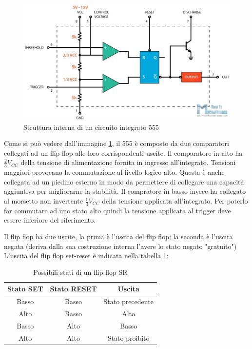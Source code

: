 \begin{figure}[h!]
	\centering
	\includegraphics[width=\linewidth]{./ImageFiles/Laboratorio 4/555internals.jpg}
	\caption{Struttura interna di un circuito integrato 555}
	\label{fig:555_internals}
\end{figure}

\noindent
Come si può vedere dall'immagine \ref{fig:555_internals}, il 555 è composto da due comparatori collegati ad un flip flop alle loro corrispondenti uscite. Il comparatore in alto ha $\frac{2}{3}V_{CC}$ della tensione di alimentazione fornita in ingresso all'integrato. Tensioni maggiori provocano la commutazione al livello logico alto. Questa è anche collegata ad un piedino esterno in modo da permettere di collegare una capacità aggiuntiva per migliorarne la stabilità. Il compratore in basso invece ha collegato al morsetto non invertente $\frac{1}{3}V_{CC}$ della tensione applicata all'integrato. Per poterlo far commutare ad uno stato alto quindi la tensione applicata al trigger deve essere inferiore del riferimento.

Il flip flop ha due uscite, la prima è l'uscita del flip flop; la seconda è l'uscita negata (deriva dalla sua costruzione interna l'avere lo stato negato "gratuito")
L'uscita del flip flop set-reset è indicata nella tabella \ref{tab:flip_flop_states}:

\def\arraystretch{1.3}
\begin{table}[h!]
	\centering
	\begin{tabular}{|c|c|c|}
		\hline
		Stato SET	& Stato RESET & Uscita \\ \hline
		Basso & Basso & Stato precedente  \\ \hline
		Alto & Basso & Alto\\ \hline
		Basso & Alto & Basso\\ \hline
		Alto & Alto & Stato proibito \\ \hline
	\end{tabular}
	\caption{Possibili stati di un flip flop SR}
	\label{tab:flip_flop_states}
\end{table}


